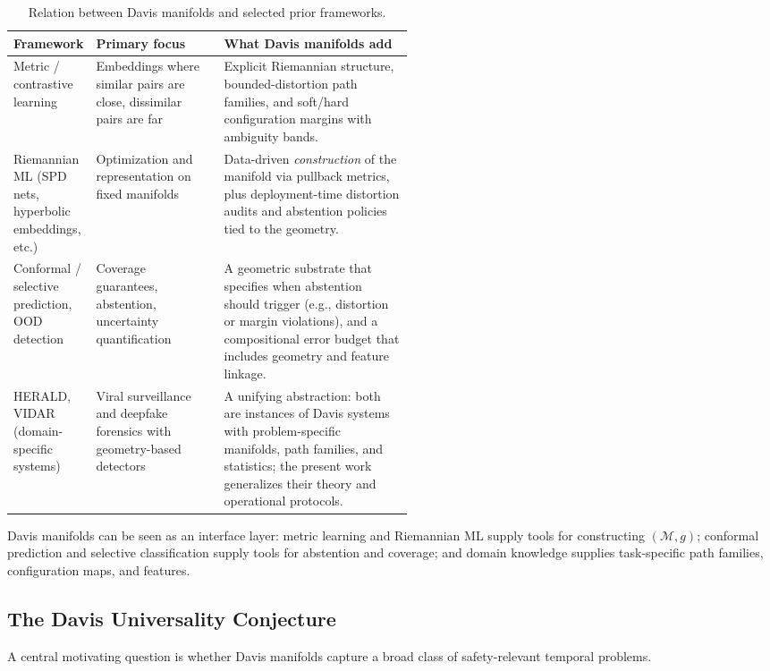\documentclass[11pt]{article}
\begin{document}
\begin{table}[H]
  \centering
  \begin{tabularx}{\linewidth}{@{}p{0.20\linewidth}p{0.32\linewidth}X@{}}
    \toprule
    \textbf{Framework} & \textbf{Primary focus} & \textbf{What Davis manifolds add} \\
    \midrule
    Metric / contrastive learning &
    Embeddings where similar pairs are close, dissimilar pairs are far &
    Explicit Riemannian structure, bounded-distortion path families, and soft/hard configuration margins with ambiguity bands. \\
    \addlinespace
    Riemannian ML (SPD nets, hyperbolic embeddings, etc.) &
    Optimization and representation on fixed manifolds &
    Data-driven \emph{construction} of the manifold via pullback metrics, plus deployment-time distortion audits and abstention policies tied to the geometry. \\
    \addlinespace
    Conformal / selective prediction, OOD detection &
    Coverage guarantees, abstention, uncertainty quantification &
    A geometric substrate that specifies when abstention should trigger (e.g., distortion or margin violations), and a compositional error budget that includes geometry and feature linkage. \\
    \addlinespace
    HERALD, VIDAR (domain-specific systems) &
    Viral surveillance and deepfake forensics with geometry-based detectors &
    A unifying abstraction: both are instances of Davis systems with problem-specific manifolds, path families, and statistics; the present work generalizes their theory and operational protocols. \\
    \bottomrule
  \end{tabularx}
  \caption{Relation between Davis manifolds and selected prior frameworks.}
  \label{tab:relation-prior-work}
\end{table}

Davis manifolds can be seen as an interface layer: metric learning and Riemannian ML supply
tools for constructing $(\mathcal{M},g)$; conformal prediction and selective classification supply tools
for abstention and coverage; and domain knowledge supplies task-specific path families, configuration
maps, and features.

\subsection{The Davis Universality Conjecture}

A central motivating question is whether Davis manifolds capture a broad class of safety-relevant
temporal problems.
\end{document}
